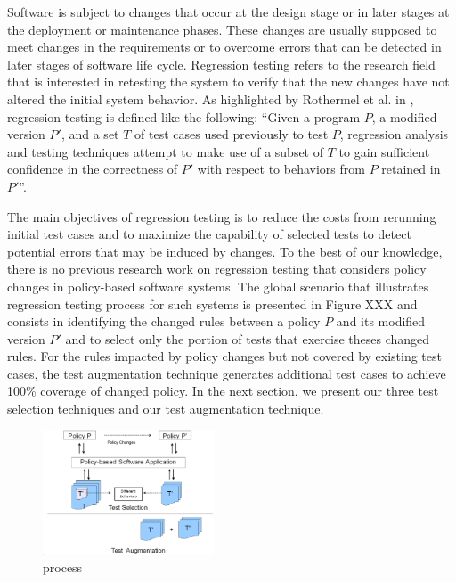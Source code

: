 Software is subject to changes that occur at the design stage or in later stages at the deployment or maintenance phases. These changes are 
usually supposed to meet changes in the requirements or to overcome errors that can be detected in later stages of software life cycle. 
Regression testing refers to the research field that is interested in retesting the system to verify that the new changes have not altered 
the initial system behavior. As highlighted by Rothermel et al. in \cite{Rothermel:1996:ART:235681.235682}, regression testing is defined like the 
following: 
``Given a program $P$, a modified version $P'$, and a set $T$ of test cases used previously to test $P$, regression analysis and testing 
techniques attempt to make use of a subset of $T$ to gain sufficient confidence in the correctness of $P'$ with respect to behaviors from $P$ retained 
in $P'$''.

The main objectives of regression testing is to reduce the costs from rerunning initial test cases and to maximize the capability of 
selected tests to detect potential errors that may be induced by changes.
To the best of our knowledge, there is no previous research work on regression testing that considers policy changes in policy-based software systems. 
The global scenario that illustrates regression testing process for such systems is presented in Figure XXX and consists in identifying the changed rules
 between a policy $P$ and its modified version $P'$ and to select only the portion of tests that exercise theses changed rules. For the rules impacted by policy 
changes but not covered by existing test cases, the test augmentation technique generates additional test cases to achieve 100\% coverage of changed policy.
In the next section, we present our three test selection techniques and our test augmentation technique.



\begin{figure}[t]
    \centering
        \includegraphics[width=2in]{regressiontesting.eps}
       \vspace{-4pt}
    \caption{\label{fig:example}process}
   \vspace{-10pt}
\end{figure}



